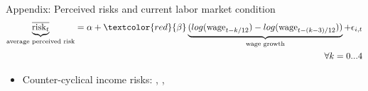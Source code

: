 \documentclass{beamer}
\begin{document}
\begin{frame}{Appendix: Perceived risks and current labor market condition}
		\label{appendix:PR_macro_labor_market_correlation}
	\begin{eqnarray*}
		\underbrace{\overline{\text{risk}_{t}}}_{\text{average perceived risk}} = \alpha + \textcolor{red}{\beta} \underbrace{(log(\text{wage}_{t-k/12}) - log(\text{wage}_{t-(k-3)/12}))}  _{\text{wage growth}}  + \epsilon_{i,t}	 \\
		\quad \forall k =0...4
	\end{eqnarray*}
	
	\begin{table}
		\centering
		\label{macro_corr_he}
	\end{table}
	\begin{itemize}
		\item Counter-cyclical income risks: \cite{storesletten2004cyclical}, \cite{guvenen2014nature}, \cite{bayer2019precautionary}
	\end{itemize}
	\quad  \hyperlink{tsMean3mvrvar_he}{} 
\end{frame}
\end{document}
